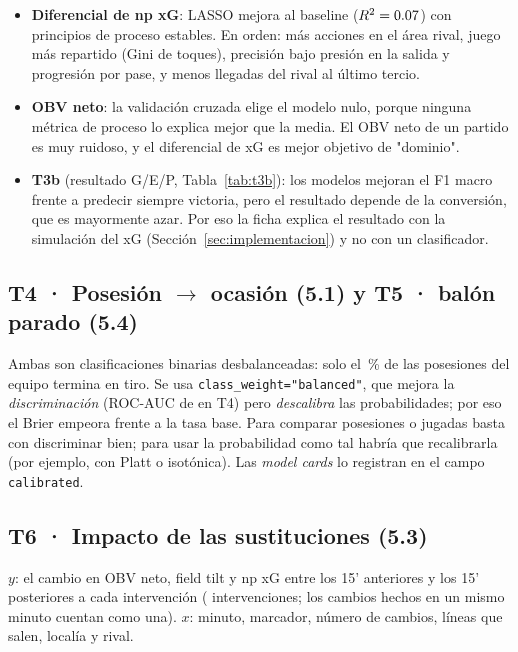 \documentclass[11pt,a4paper]{article}
\begin{document}
\begin{itemize}
  \item \textbf{Diferencial de np xG}: LASSO mejora al baseline ($R^2=0.07$) con \tresNvar{} principios de proceso
        estables. En orden: más acciones en el área rival, juego más repartido (Gini de toques), precisión bajo presión
        en la salida y progresión por pase, y menos llegadas del rival al último tercio.
  \item \textbf{OBV neto}: la validación cruzada elige el modelo nulo, porque ninguna métrica de proceso lo explica mejor
        que la media. El OBV neto de un partido es muy ruidoso, y el diferencial de xG es mejor objetivo de "dominio".
  \item \textbf{T3b} (resultado G/E/P, Tabla~\ref{tab:t3b}): los modelos mejoran el F1 macro frente a predecir siempre
        victoria, pero el resultado depende de la conversión, que es mayormente azar. Por eso la ficha explica el
        resultado con la simulación del xG (Sección~\ref{sec:implementacion}) y no con un clasificador.
\end{itemize}



\subsection{T4 · Posesión $\rightarrow$ ocasión (5.1) y T5 · balón parado (5.4)}
Ambas son clasificaciones binarias desbalanceadas: solo el \cuatroPrev\,\% de las posesiones del equipo termina en
tiro. Se usa \texttt{class\_weight="balanced"}, que mejora la \emph{discriminación} (ROC-AUC de \cuatroAUC{} en T4) pero
\emph{descalibra} las probabilidades; por eso el Brier empeora frente a la tasa base. Para comparar posesiones o
jugadas basta con discriminar bien; para usar la probabilidad como tal habría que recalibrarla (por ejemplo, con
Platt o isotónica). Las \emph{model cards} lo registran en el campo \texttt{calibrated}.






\subsection{T6 · Impacto de las sustituciones (5.3)}
\textbf{$y$}: el cambio en OBV neto, field tilt y np xG entre los 15' anteriores y los 15' posteriores a cada intervención
(\nCambios{} intervenciones; los cambios hechos en un mismo minuto cuentan como una). \textbf{$x$}: minuto, marcador,
número de cambios, líneas que salen, localía y rival.
\end{document}
